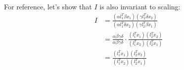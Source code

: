 \documentclass[11pt,a4paper]{article}
\begin{document}
\begin{enumerate}
\begin{enumerate}
                        For reference, let's show that $I$ is also invariant to scaling:
                        \begin{align*}
                              I & = \frac{(\alpha l_1^T \beta x_1)(\gamma l_2^T \delta x_2)}{(\alpha l_1^T \delta x_2)(\gamma l_2^T \beta x_1)}               \\
                                & = \frac{\alpha \beta \gamma \delta}{\alpha \beta \gamma \delta} \cdot \frac{(l_1^T x_1)(l_2^T x_2)}{(l_1^T x_2)(l_2^T x_1)} \\
                                & = \frac{(l_1^T x_1)(l_2^T x_2)}{(l_1^T x_2)(l_2^T x_1)}
                        \end{align*}

            \end{enumerate}

            \newpage

\end{enumerate}
\end{document}
